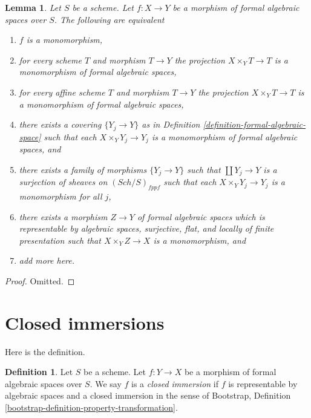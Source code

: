 \documentclass{stacks-project}
\theoremstyle{plain}
\newtheorem{lemma}[subsection]{Lemma}
\theoremstyle{definition}
\newtheorem{definition}[subsection]{Definition}
\theoremstyle{remark}
\numberwithin{equation}{subsection}
\def\Sch{\mathit{Sch}}
\begin{document}
\begin{lemma}
\label{lemma-characterize-monomorphisms}
Let $S$ be a scheme. Let $f : X \to Y$ be a morphism of formal algebraic
spaces over $S$. The following are equivalent
\begin{enumerate}
\item $f$ is a monomorphism,
\item for every scheme $T$ and morphism $T \to Y$
the projection $X \times_Y T \to T$ is a monomorphism
of formal algebraic spaces,
\item for every affine scheme $T$ and morphism $T \to Y$
the projection $X \times_Y T \to T$ is a monomorphism of formal
algebraic spaces,
\item there exists a covering $\{Y_j \to Y\}$ as in
Definition \ref{definition-formal-algebraic-space}
such that each $X \times_Y Y_j \to Y_j$ is a monomorphism of
formal algebraic spaces, and
\item there exists a family of morphisms $\{Y_j \to Y\}$ such
that $\coprod Y_j \to Y$ is a surjection of sheaves on
$(\Sch/S)_{fppf}$ such that each $X \times_Y Y_j \to Y_j$ is a
monomorphism for all $j$,
\item there exists a morphism $Z \to Y$ of formal algebraic spaces
which is representable by algebraic spaces, surjective, flat, and locally
of finite presentation such that $X \times_Y Z \to X$ is a monomorphism, and
\item add more here.
\end{enumerate}
\end{lemma}

\begin{proof}
Omitted.
\end{proof}





\section{Closed immersions}
\label{section-closed-immersions}

\noindent
Here is the definition.

\begin{definition}
\label{definition-closed-immersion}
Let $S$ be a scheme. Let $f : Y \to X$ be a morphism of formal algebraic
spaces over $S$. We say $f$ is a {\it closed immersion}
if $f$ is representable by algebraic spaces and a closed immersion
in the sense of
Bootstrap, Definition \ref{bootstrap-definition-property-transformation}.
\end{definition}
\end{document}
